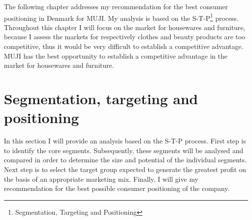 The following chapter addresses my recommendation for the best consumer positioning in Denmark for MUJI. My analysis is based on the S-T-P\footnote{Segmentation, Targeting and Positioning} process. Throughout this chapter I will focus on the market for housewares and furniture, because I assess the markets for respectively clothes and beauty products are too competitive, thus it would be very difficult to establish a competitive advantage. %
MUJI has the best opportunity to establish a competitive advantage in the market for housewares and furniture. 



\section{Segmentation, targeting and positioning}
In this section I will provide an analysis based on the S-T-P process. First step is to identify the core segments. Subsequently, these segments will be analysed and compared in order to determine the size and potential of the individual segments. Next step is to select the target group expected to generate the greatest profit on the basis of an appropriate marketing mix. Finally, I will give my recommendation for the best possible consumer positioning of the company.
